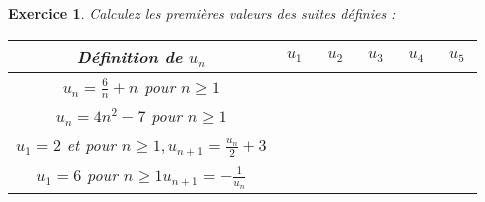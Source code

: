\documentclass[11pt,a4paper]{exam}
\newtheorem{exo}{Exercice}
\begin{document}
\vspace{0.5cm}
\begin{exo}Calculez les premières valeurs des suites définies :

\renewcommand{\arraystretch}{2}
\begin{center}
    \begin{tabular}{|c|c|c|c|c|c|}
        \hline
          Définition de $u_n$&$\;u_1\;$&$\;u_2\;$&$\;u_3\;$&$\;u_4\;$&$\;u_5\;$\\
          \hline
         $u_n=\frac{6}{n}+n$ pour $n \geq 1$& & & & &\\
          \hline
         $u_n=4n^2-7$ pour $n \geq 1$& & & & &\\
          \hline
         $u_1=2$ et pour $n \geq 1, u_{n+1}=\frac{u_n}{2} + 3$& & & & &\\
          \hline
         $u_1=6$ pour $n \geq 1 u_{n+1} = -\frac{1}{u_n}$& & & & &\\
          \hline
    \end{tabular}
\end{center}
\end{exo} 
\vspace{0.5cm}
\end{document}
